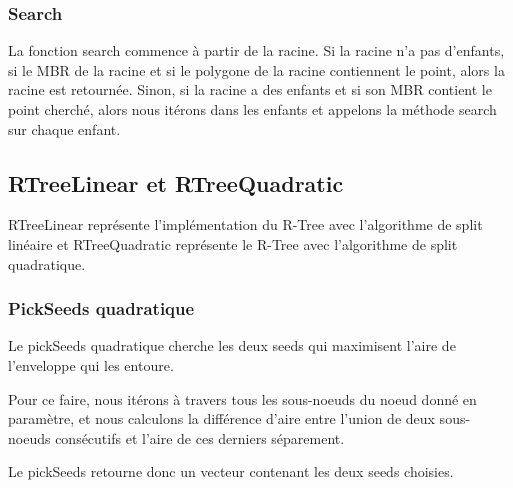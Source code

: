 \documentclass[utf8]{article}
\begin{document}
\begin{large}
  \par
  \subsubsection{Search}
  \par
  \indent
  La fonction search commence à partir de la racine. Si la racine n'a pas
  d'enfants, si le MBR de la racine et si le polygone de la racine contiennent
  le point, alors la racine est retournée. Sinon, si la racine a des enfants et
  si son MBR contient le point cherché, alors nous itérons dans les enfants et
  appelons la méthode search sur chaque enfant.

  \par
  \subsection{RTreeLinear et RTreeQuadratic}\label{RTreeLinear}
  \par
  \indent

  RTreeLinear représente l'implémentation du R-Tree avec l'algorithme de split
  linéaire et RTreeQuadratic représente le R-Tree avec l'algorithme de split quadratique.
  \par

  \subsubsection{PickSeeds quadratique}\label{PickSeeds quadratique}
  \par
  \indent
  Le pickSeeds quadratique cherche les deux seeds qui maximisent l'aire de l'enveloppe qui les entoure.
  \par
  \indent
  Pour ce faire, nous itérons à travers tous les sous-noeuds du noeud donné en paramètre,
  et nous calculons la différence d'aire entre l'union de deux sous-noeuds consécutifs et l'aire de
  ces derniers séparement.
  \par
  \par
  \indent
  Le pickSeeds retourne donc un vecteur contenant les deux seeds choisies.
  \par

\end{large}
\end{document}
